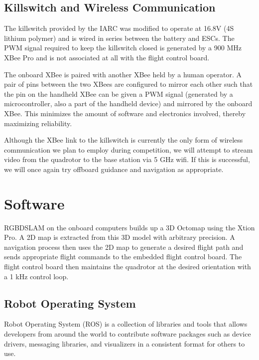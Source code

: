 \documentclass[12pt,letterpaper]{article} \usepackage[margin=1in]{geometry}
\begin{document}
\subsection*{Killswitch and Wireless Communication}

The killswitch provided by the IARC was modified to operate at 16.8V (4S
lithium polymer) and is wired in series between the battery and ESCs. The PWM
signal required to keep the killswitch closed is generated by a 900 MHz XBee
Pro and is not associated at all with the flight control board.

The onboard XBee is paired with another XBee held by a human operator. A pair
of pins between the two XBees are configured to mirror each other such that the
pin on the handheld XBee can be given a PWM signal (generated by
a microcontroller, also a part of the handheld device) and mirrored by the
onboard XBee. This minimizes the amount of software and electronics involved,
thereby maximizing reliability.

Although the XBee link to the killswitch is currently the only form of wireless
communication we plan to employ during competition, we will attempt to stream
video from the quadrotor to the base station via 5 GHz wifi. If this is
successful, we will once again try offboard guidance and navigation as
appropriate.



\section*{Software}

RGBDSLAM on the onboard computers builds up a 3D Octomap using the Xtion Pro.
A 2D map is extracted from this 3D model with arbitrary precision. A navigation
process then uses the 2D map to generate a desired flight path and sends
appropriate flight commands to the embedded flight control board. The flight
control board then maintains the quadrotor at the desired orientation with
a 1 kHz control loop.


\subsection*{Robot Operating System}

Robot Operating System (ROS) is a collection of libraries and tools that allows
developers from around the world to contribute software packages such as device
drivers, messaging libraries, and visualizers in a consistent format for others
to use.
\end{document}
